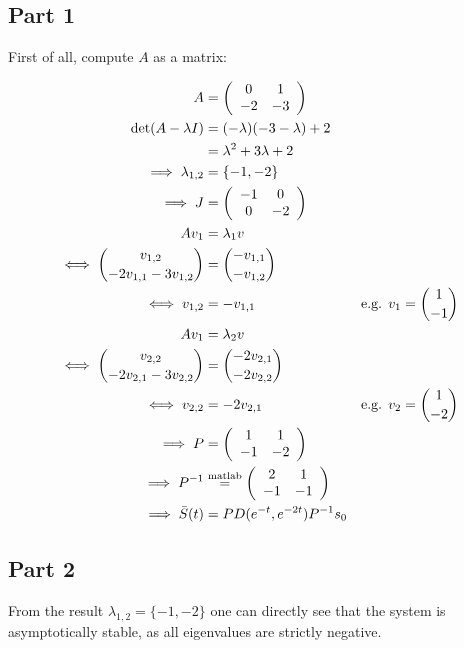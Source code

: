 \documentclass[a4paper,parskip,headheight=38pt]{scrartcl} %
\begin{document}
\subsection*{Part 1}

First of all, compute $A$ as a matrix:

\begin{align*}
    A &= \left( \begin{array}{cc} 0 & 1 \\ -2 & -3 \end{array} \right) \\
    \det(A - \lambda I) &= (-\lambda)(-3-\lambda) + 2 \\
    &= \lambda^2 + 3\lambda + 2 \\
    \implies \lambda_{1,2} &= \{-1, -2\} \\
    \implies J &= \left( \begin{array}{cc} -1 & 0 \\ 0 & -2 \end{array} \right) \\
    Av_1 &= \lambda_1 v \\
    \iff \binom{v_{1,2}}{-2v_{1,1}-3v_{1,2}} &= \binom{-v_{1,1}}{-v_{1,2}} \\
    \iff v_{1,2} &= -v_{1,1} & \text{e.g. } v_1 = \binom{1}{-1} \\
    Av_1 &= \lambda_2 v \\
    \iff \binom{v_{2,2}}{-2v_{2,1}-3v_{2,2}} &= \binom{-2v_{2,1}}{-2v_{2,2}} \\
    \iff v_{2,2} &= -2 v_{2,1} & \text{e.g. } v_2 = \binom{1}{-2} \\
    \implies P &= \left( \begin{array}{cc} 1 & 1 \\ -1 & -2 \end{array} \right) \\
    \implies P^{-1} &\overset{\text{\scriptsize{matlab}}}{=} \left( \begin{array}{cc} 2 & 1 \\ -1 & -1 \end{array} \right) \\
    \implies \bar{S}(t) &= P D(e^{-t}, e^{-2t}) P^{-1} s_0
\end{align*}

\subsection*{Part 2}

From the result $\lambda_{1,2} = \{-1, -2\}$ one can directly see that
the system is asymptotically stable, as all eigenvalues are strictly
negative.
\end{document}
